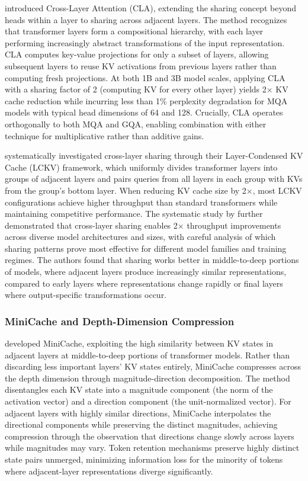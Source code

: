 \citet{brandon2024reducing} introduced Cross-Layer Attention (CLA), extending the sharing concept beyond heads within a layer to sharing across adjacent layers. The method recognizes that transformer layers form a compositional hierarchy, with each layer performing increasingly abstract transformations of the input representation. CLA computes key-value projections for only a subset of layers, allowing subsequent layers to reuse KV activations from previous layers rather than computing fresh projections. At both 1B and 3B model scales, applying CLA with a sharing factor of 2 (computing KV for every other layer) yields 2$\times$ KV cache reduction while incurring less than 1\% perplexity degradation for MQA models with typical head dimensions of 64 and 128. Crucially, CLA operates orthogonally to both MQA and GQA, enabling combination with either technique for multiplicative rather than additive gains.

\citet{yang2024layercondensed} systematically investigated cross-layer sharing through their Layer-Condensed KV Cache (LCKV) framework, which uniformly divides transformer layers into groups of adjacent layers and pairs queries from all layers in each group with KVs from the group's bottom layer. When reducing KV cache size by 2$\times$, most LCKV configurations achieve higher throughput than standard transformers while maintaining competitive performance. The systematic study by \citet{tu2024systematic} further demonstrated that cross-layer sharing enables 2$\times$ throughput improvements across diverse model architectures and sizes, with careful analysis of which sharing patterns prove most effective for different model families and training regimes. The authors found that sharing works better in middle-to-deep portions of models, where adjacent layers produce increasingly similar representations, compared to early layers where representations change rapidly or final layers where output-specific transformations occur.

\subsubsection{MiniCache and Depth-Dimension Compression}

\citet{jia2024minicache} developed MiniCache, exploiting the high similarity between KV states in adjacent layers at middle-to-deep portions of transformer models. Rather than discarding less important layers' KV states entirely, MiniCache compresses across the depth dimension through magnitude-direction decomposition. The method disentangles each KV state into a magnitude component (the norm of the activation vector) and a direction component (the unit-normalized vector). For adjacent layers with highly similar directions, MiniCache interpolates the directional components while preserving the distinct magnitudes, achieving compression through the observation that directions change slowly across layers while magnitudes may vary. Token retention mechanisms preserve highly distinct state pairs unmerged, minimizing information loss for the minority of tokens where adjacent-layer representations diverge significantly.

